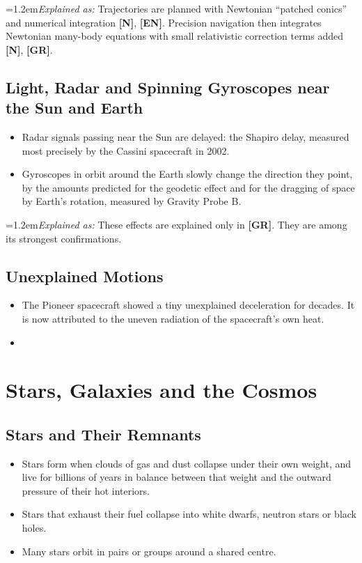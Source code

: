 \documentclass[11pt,a4paper]{article}
\newcommand{\reg}[1]{\textsf{\small\textbf{[#1]}}}
\newcommand{\RN}{\reg{N}}
\newcommand{\RGR}{\reg{GR}}
\newcommand{\REN}{\reg{EN}}
\newcommand{\expl}[1]{\par\begingroup\leftskip=1.2em\small\noindent\textit{Explained as:} #1\par\endgroup\smallskip}%
\begin{document}
\expl{Trajectories are planned with Newtonian ``patched conics'' and numerical integration \RN{}, \REN{}. Precision navigation then integrates Newtonian many-body equations with small relativistic correction terms added \RN{}, \RGR{}.}

\subsection{Light, Radar and Spinning Gyroscopes near the Sun and Earth}

\begin{itemize}
  \item Radar signals passing near the Sun are delayed: the Shapiro delay, measured most precisely by the Cassini spacecraft in 2002.
  \item Gyroscopes in orbit around the Earth slowly change the direction they point, by the amounts predicted for the geodetic effect and for the dragging of space by Earth's rotation, measured by Gravity Probe B.
\end{itemize}

\expl{These effects are explained only in \RGR{}. They are among its strongest confirmations.}

\subsection{Unexplained Motions}

\begin{itemize}
  \item The Pioneer spacecraft showed a tiny unexplained deceleration for decades. It is now attributed to the uneven radiation of the spacecraft's own heat.
  \item {}
\end{itemize}

\section{Stars, Galaxies and the Cosmos}

\subsection{Stars and Their Remnants}

\begin{itemize}
  \item Stars form when clouds of gas and dust collapse under their own weight, and live for billions of years in balance between that weight and the outward pressure of their hot interiors.
  \item Stars that exhaust their fuel collapse into white dwarfs, neutron stars or black holes.
  \item Many stars orbit in pairs or groups around a shared centre.
\end{itemize}
\end{document}
